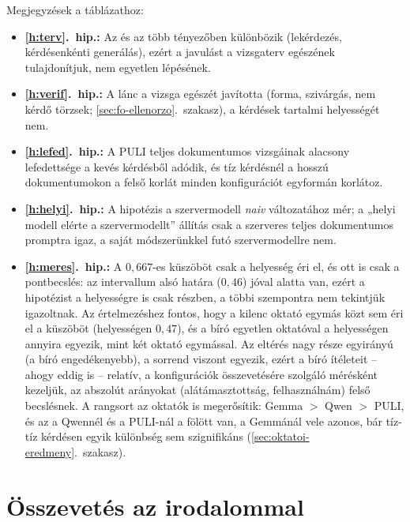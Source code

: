 Megjegyzések a táblázathoz:
\begin{itemize}[leftmargin=*,itemsep=1pt,topsep=2pt]
\item \textbf{\ref{h:terv}.\ hip.:} Az  és az  több tényezőben különbözik
(lekérdezés, kérdésenkénti generálás), ezért a javulást a vizsgaterv egészének tulajdonítjuk, nem egyetlen
lépésének.
\item \textbf{\ref{h:verif}.\ hip.:} A lánc a vizsga egészét javította (forma, szivárgás, nem kérdő törzsek;
\ref{sec:fo-ellenorzo}.~szakasz), a kérdések tartalmi helyességét nem.
\item \textbf{\ref{h:lefed}.\ hip.:} A PULI teljes
dokumentumos vizsgáinak alacsony lefedettsége a kevés kérdésből adódik, és tíz kérdésnél a hosszú
dokumentumokon a felső korlát minden konfigurációt egyformán korlátoz.
\item \textbf{\ref{h:helyi}.\ hip.:} A hipotézis a
szervermodell \emph{naiv} változatához mér; a „helyi modell elérte a szervermodellt” állítás csak a szerveres
teljes dokumentumos promptra igaz, a saját módszerünkkel futó szervermodellre nem.
\item \textbf{\ref{h:meres}.\ hip.:} A $0{,}667$-es küszöböt csak a helyesség éri el, és ott is csak a
pontbecslés: az intervallum alsó határa ($0{,}46$) jóval alatta van, ezért a hipotézist a helyességre is csak
részben, a többi szempontra nem tekintjük igazoltnak. Az értelmezéshez fontos, hogy a kilenc oktató egymás
közt sem éri el a küszöböt (helyességen $0{,}47$), és a bíró egyetlen oktatóval a helyességen annyira egyezik,
mint két oktató egymással. Az eltérés nagy része egyirányú (a bíró engedékenyebb), a sorrend viszont egyezik,
ezért a bíró ítéleteit -- ahogy eddig is -- relatív, a konfigurációk összevetésére szolgáló mérésként kezeljük,
az abszolút arányokat (alátámasztottság, felhasználnám) felső becslésnek. A rangsort az oktatók is
megerősítik: Gemma $>$ Qwen $>$ PULI, és az  a Qwennél és a PULI-nál a  fölött van, a
Gemmánál vele azonos, bár tíz-tíz kérdésen egyik különbség sem szignifikáns
(\ref{sec:oktatoi-eredmeny}.~szakasz).
\end{itemize}

\section{Összevetés az irodalommal}
\label{sec:irod-osszevetes}

